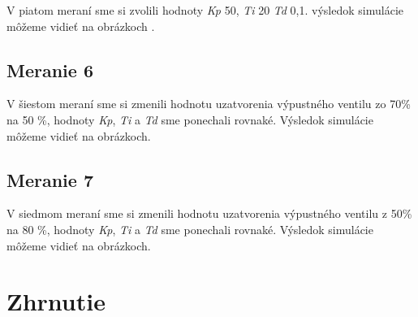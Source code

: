 \documentclass{article}
\begin{document}
V piatom meraní sme si zvolili hodnoty \textit{Kp} 50, \textit{Ti} 20 \textit{Td} 0,1. výsledok simulácie môžeme vidieť na obrázkoch  .


\clearpage

\subsection{Meranie 6}
\label{sec:meranie6}

V šiestom meraní sme si zmenili hodnotu uzatvorenia výpustného ventilu zo 70\% na 50 \%, hodnoty
\textit{Kp}, \textit{Ti} a \textit{Td} sme ponechali rovnaké. Výsledok simulácie môžeme vidieť na obrázkoch.


\clearpage

\subsection{Meranie 7}
\label{sec:meranie7}

V siedmom meraní sme si zmenili hodnotu uzatvorenia výpustného ventilu z 50\% na 80 \%, hodnoty
\textit{Kp}, \textit{Ti} a \textit{Td} sme ponechali rovnaké. Výsledok simulácie môžeme vidieť na obrázkoch.


\clearpage

\section{Zhrnutie}
\label{sec:zhrnutie}

\end{document}
